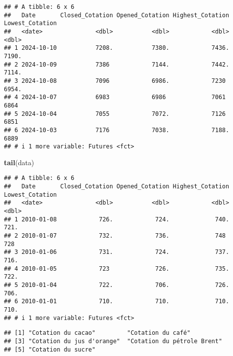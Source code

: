 \documentclass[
]{article}
\newenvironment{Shaded}{\begin{snugshade}}{\end{snugshade}}
\newcommand{\FunctionTok}[1]{\textcolor[rgb]{0.13,0.29,0.53}{\textbf{#1}}}
\newcommand{\NormalTok}[1]{#1}
\newcommand{\SpecialCharTok}[1]{\textcolor[rgb]{0.81,0.36,0.00}{\textbf{#1}}}
\begin{document}
\begin{verbatim}
## # A tibble: 6 x 6
##   Date       Closed_Cotation Opened_Cotation Highest_Cotation Lowest_Cotation
##   <date>               <dbl>           <dbl>            <dbl>           <dbl>
## 1 2024-10-10           7208.           7380.            7436.           7190.
## 2 2024-10-09           7386            7144.            7442.           7114.
## 3 2024-10-08           7096            6986.            7230            6954.
## 4 2024-10-07           6983            6986             7061            6864 
## 5 2024-10-04           7055            7072.            7126            6851 
## 6 2024-10-03           7176            7038.            7188.           6889 
## # i 1 more variable: Futures <fct>
\end{verbatim}

\begin{Shaded}
\begin{Highlighting}[]
\FunctionTok{tail}\NormalTok{(data)}
\end{Highlighting}
\end{Shaded}

\begin{verbatim}
## # A tibble: 6 x 6
##   Date       Closed_Cotation Opened_Cotation Highest_Cotation Lowest_Cotation
##   <date>               <dbl>           <dbl>            <dbl>           <dbl>
## 1 2010-01-08            726.            724.             740.            721.
## 2 2010-01-07            732.            736.             748             728 
## 3 2010-01-06            731.            724.             737.            716.
## 4 2010-01-05            723             726.             735.            722.
## 5 2010-01-04            722.            706.             726.            706.
## 6 2010-01-01            710.            710.             710.            710.
## # i 1 more variable: Futures <fct>
\end{verbatim}

\begin{Shaded}
\end{Shaded}

\begin{verbatim}
## [1] "Cotation du cacao"         "Cotation du café"         
## [3] "Cotation du jus d'orange"  "Cotation du pétrole Brent"
## [5] "Cotation du sucre"
\end{verbatim}
\end{document}
